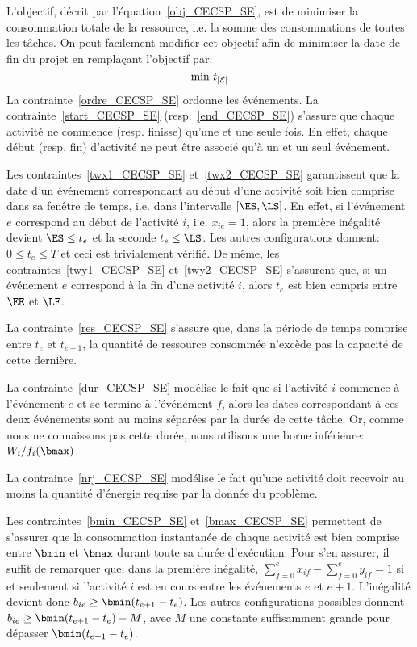 L'objectif, décrit par l'équation~\eqref{obj_CECSP_SE}, est de
minimiser la consommation totale de la ressource, i.e. la somme des
consommations de toutes les tâches. On peut facilement modifier cet
objectif afin de minimiser la date de fin du projet en remplaçant
l'objectif par:
\begin{equation}
\text{min } t_{|{\cal E}|} \notag
\end{equation}
La contrainte~\eqref{ordre_CECSP_SE} ordonne les événements. La
contrainte~\eqref{start_CECSP_SE} (resp.~\eqref{end_CECSP_SE})
s'assure que chaque activité ne commence (resp. finisse) qu'une et une
seule fois. En effet, chaque début (resp. fin) d'activité ne peut être
associé qu'à un et un seul événement.
 
Les contraintes~\eqref{twx1_CECSP_SE} et~\eqref{twx2_CECSP_SE}
garantissent que la date d'un événement correspondant au début d'une
activité soit bien comprise dans sa fenêtre de temps, i.e. dans
l'intervalle $[\ES,\LS]$. En effet, si l'événement $e$ correspond au
début de l'activité $i$, i.e. $x_{ie}=1$, alors la première inégalité
devient $\ES \le t_e$ et la seconde $t_e \le \LS$. Les autres
configurations donnent: $0 \le t_e \le T$ et ceci est trivialement
vérifié. De même, les contraintes~\eqref{twy1_CECSP_SE}
et~\eqref{twy2_CECSP_SE} s'assurent que, si un événement $e$
correspond à la fin d'une activité $i$, alors $t_e$ est bien compris
entre $\EE$ et $\LE$.

La contrainte~\eqref{res_CECSP_SE} s'assure que, dans la période de
temps comprise entre $t_e$ et $t_{e+1}$, la quantité de ressource
consommée n’excède pas la capacité de cette dernière.

La contrainte~\eqref{dur_CECSP_SE} modélise le fait que si l'activité
$i$ commence à l'événement $e$ et se termine à l'événement $f$, alors
les dates correspondant à ces deux événements sont au moins séparées
par la durée de cette tâche. Or, comme nous ne connaissons pas cette
durée, nous utilisons une borne inférieure: $W_i/f_i(\bmax)$.

La contrainte~\eqref{nrj_CECSP_SE} modélise le fait qu'une activité
doit recevoir au moins la quantité d'énergie requise par la donnée du
problème.

Les contraintes~\eqref{bmin_CECSP_SE} et~\eqref{bmax_CECSP_SE}
permettent de s'assurer que la consommation instantanée de chaque
activité est bien comprise entre $\bmin$ et $\bmax$ durant toute sa
durée d'exécution. Pour s'en assurer, il suffit de remarquer que, dans
la première inégalité, $\sum_{f=0}^{e} x_{if}-\sum_{f=0}^{e}y_{if}=1$
si et seulement si l'activité $i$ est en cours entre les événements
$e$ et $e+1$.  L'inégalité devient donc $b_{ie} \ge
\bmin(t_{e+1}-t_e)$. Les autres configurations possibles donnent
$b_{ie} \ge \bmin(t_{e+1}-t_e)-M$, avec $M$ une constante
suffisamment grande pour dépasser $\bmin(t_{e+1}-t_e)$.

